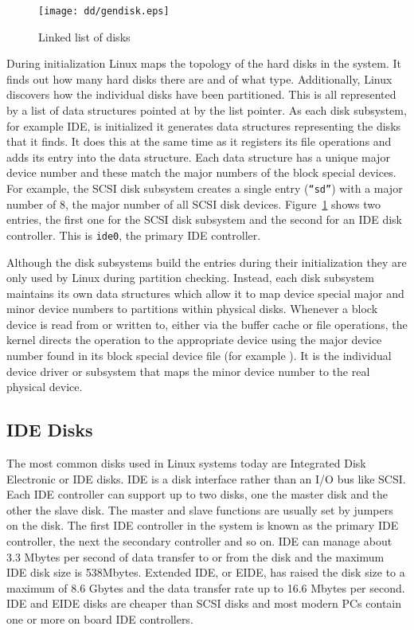 \begin{figure}
\begin{center}
{\centering \texttt{[image: dd/gendisk.eps]} \par}
\end{center}
\caption{Linked list of disks}
\label{gendisk-figure}
\end{figure}
During initialization Linux maps the topology of the hard disks in the system.
It finds out how many hard disks there are and of what type.
Additionally, Linux discovers how the individual disks have been partitioned.
This is all represented by a list of  data structures pointed at by the 
list pointer.
As each disk subsystem, for example IDE, is initialized it generates  data structures representing
the disks that it finds.
It does this at the same time as it registers its file operations and adds its entry into the 
 data structure.
Each  data structure has a unique major device number and these match the major numbers of the
block special devices.
For example, the SCSI disk subsystem creates a single  entry (\texttt{``sd''}) with a major number
of 8, the major number of all SCSI disk devices.
Figure~\ref{gendisk-figure} shows two  entries, the first one for the SCSI disk subsystem and the second
for an IDE disk controller.
This is \texttt{ide0}, the primary IDE controller.

Although the disk subsystems build the  entries during their initialization they are only
used by Linux during partition checking.
Instead, each disk subsystem maintains its own data structures which allow it to map device special
major and minor device numbers to partitions within physical disks.
Whenever a block device is read from or written to, either via the buffer cache or file operations, the
kernel directs the operation to the appropriate device using the major device number found in its
block special device file (for example ).
It is the individual device driver or subsystem that maps the minor device number to the real physical device.

\subsection{IDE Disks}
The most common disks used in Linux systems today are Integrated Disk Electronic  or IDE disks.
IDE is a disk interface rather than an I/O bus like SCSI.
Each IDE controller can support up to two disks, one the master disk and the other the slave disk.
The master and slave functions are usually set by jumpers on the disk.
The first IDE controller in the system is known as the primary IDE controller, the next the
secondary controller and so on.
IDE can manage about 3.3 Mbytes per second of data transfer to or from the disk and the maximum
IDE disk size is 538Mbytes.
Extended IDE, or EIDE, has raised the disk size to a maximum of 8.6 Gbytes and the data transfer 
rate up to 16.6 Mbytes per second.
IDE and EIDE disks are cheaper than SCSI disks and most modern PCs contain one or more
on board IDE controllers.

